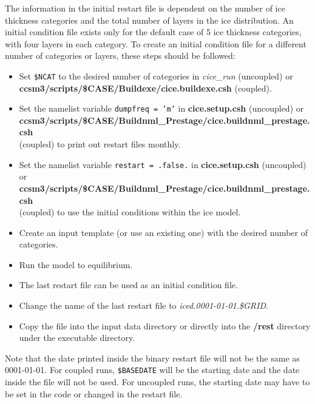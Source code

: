 The information in the initial restart file is dependent on the number of
ice thickness categories and the total number of layers in the ice distribution.
An initial condition file exists only for the default case of 5 ice thickness
categories, with four layers in each category. To create an initial condition
file for a different number of categories or layers, these steps should be 
followed:

\begin{itemize}
  \item Set {\tt \$NCAT} to the desired number of categories in {\it cice\_run}
        (uncoupled) or \\
        {\bf ccsm3/scripts/\$CASE/Buildexe/cice.buildexe.csh} (coupled).
  \item Set the namelist variable {\tt dumpfreq = 'm'} in {\bf cice.setup.csh}
        (uncoupled) or \\
        {\bf ccsm3/scripts/\$CASE/Buildnml\_Prestage/cice.buildnml\_prestage.csh} \\
        (coupled) to print out restart files monthly.
  \item Set the namelist variable {\tt restart = .false.} in {\bf cice.setup.csh}
        (uncoupled) or \\
        {\bf ccsm3/scripts/\$CASE/Buildnml\_Prestage/cice.buildnml\_prestage.csh} \\
        (coupled) to use the initial conditions within the ice model.
  \item Create an input template (or use an existing one) with the desired
        number of categories.
  \item Run the model to equilibrium. 
  \item The last restart file can be used as an initial condition file.
  \item Change the name of the last restart file to {\it iced.0001-01-01.\$GRID}.
  \item Copy the file into the input data directory or directly into the {\bf /rest}
        directory under the executable directory.
\end{itemize}

Note that the date printed inside the binary restart file will not be the same as
0001-01-01.  For coupled runs, {\tt \$BASEDATE} will be the starting date and the
date inside the file will not be used.  For uncoupled runs, the starting date may
have to be set in the code or changed in the restart file.

